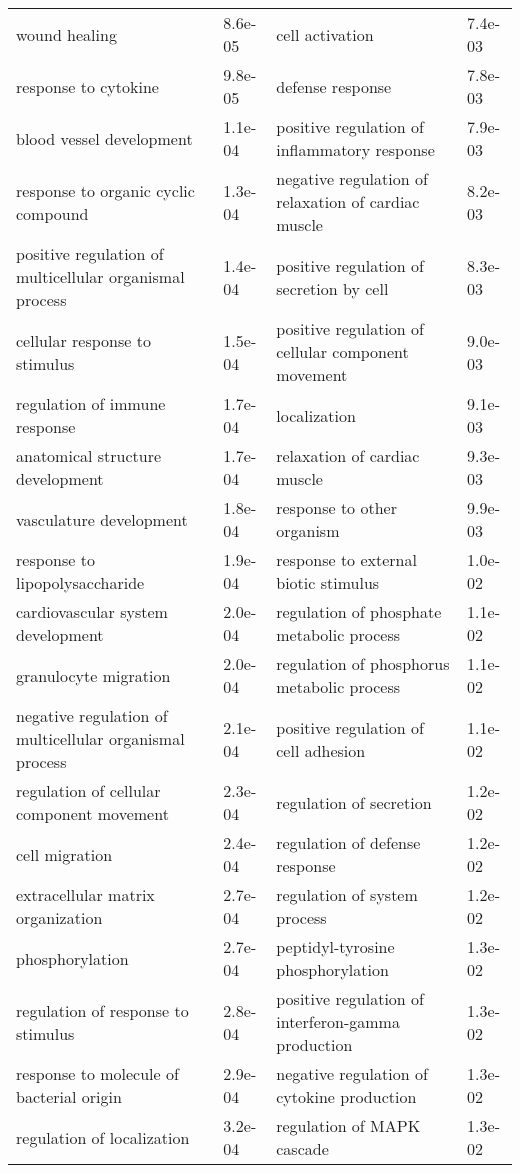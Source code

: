 \documentclass[fleqn,10pt]{SelfArx} %
\begin{document}
\begin{table}[ht]
\begin{tabularx}{\textwidth}{XlXl}
		wound healing & 8.6e-05 & cell activation & 7.4e-03 \\ 
		response to cytokine & 9.8e-05 & defense response & 7.8e-03 \\ 
		blood vessel development & 1.1e-04 & positive regulation of inflammatory response & 7.9e-03 \\ 
		response to organic cyclic compound & 1.3e-04 & negative regulation of relaxation of cardiac muscle & 8.2e-03 \\ 
		positive regulation of multicellular organismal process & 1.4e-04 & positive regulation of secretion by cell & 8.3e-03 \\ 
		cellular response to stimulus & 1.5e-04 & positive regulation of cellular component movement & 9.0e-03 \\ 
		regulation of immune response & 1.7e-04 & localization & 9.1e-03 \\ 
		anatomical structure development & 1.7e-04 & relaxation of cardiac muscle & 9.3e-03 \\ 
		vasculature development & 1.8e-04 & response to other organism & 9.9e-03 \\ 
		response to lipopolysaccharide & 1.9e-04 & response to external biotic stimulus & 1.0e-02 \\ 
		cardiovascular system development & 2.0e-04 & regulation of phosphate metabolic process & 1.1e-02 \\ 
		granulocyte migration & 2.0e-04 & regulation of phosphorus metabolic process & 1.1e-02 \\ 
		negative regulation of multicellular organismal process & 2.1e-04 & positive regulation of cell adhesion & 1.1e-02 \\ 
		regulation of cellular component movement & 2.3e-04 & regulation of secretion & 1.2e-02 \\ 
		cell migration & 2.4e-04 & regulation of defense response & 1.2e-02 \\ 
		extracellular matrix organization & 2.7e-04 & regulation of system process & 1.2e-02 \\ 
		phosphorylation & 2.7e-04 & peptidyl-tyrosine phosphorylation & 1.3e-02 \\ 
		regulation of response to stimulus & 2.8e-04 & positive regulation of interferon-gamma production & 1.3e-02 \\ 
		response to molecule of bacterial origin & 2.9e-04 & negative regulation of cytokine production & 1.3e-02 \\ 
		regulation of localization & 3.2e-04 & regulation of MAPK cascade & 1.3e-02 \\ 

\end{tabularx}
\end{table}
\end{document}
